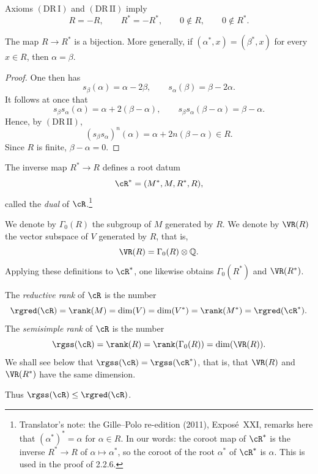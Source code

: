 \begin{remark}\label{sga3:XXI:1.1.3}
Axioms \((\mathrm{DR\,I})\) and \((\mathrm{DR\,II})\) imply
\[
 R=-R,\qquad R^\ast=-R^\ast,\qquad
 0\notin R,\qquad 0\notin R^\ast.
\]
\end{remark}

\begin{lemma}\label{sga3:XXI:1.1.4}
The map \(R\to R^\ast\) is a bijection. More generally, if
\((\alpha^\ast,x)=(\beta^\ast,x)\) for every \(x\in R\), then
\(\alpha=\beta\).
\end{lemma}

\begin{proof}
One then has
\[
 s_\beta(\alpha)=\alpha-2\beta,\qquad
 s_\alpha(\beta)=\beta-2\alpha.
\]
It follows at once that
\[
 s_\beta s_\alpha(\alpha)
   =\alpha+2(\beta-\alpha),\qquad
 s_\beta s_\alpha(\beta-\alpha)
   =\beta-\alpha.
\]
Hence, by \((\mathrm{DR\,II})\),
\[
 (s_\beta s_\alpha)^n(\alpha)
   =\alpha+2n(\beta-\alpha)\in R.
\]
Since \(R\) is finite, \(\beta-\alpha=0\).
\end{proof}

\begin{corollary}\label{sga3:XXI:1.1.5}
The inverse map \(R^\ast\to R\) defines a root datum
\[
 \cR^\ast=(M^\ast,M,R^\ast,R),
\]
called the \emph{dual} of \(\cR\).\footnote{Translator's note: the Gille--Polo re-edition (2011), Exposé~XXI, remarks here that
\((\alpha^\ast)^\ast=\alpha\) for \(\alpha\in R\). In our words: the coroot map of
\(\cR^\ast\) is the inverse \(R^\ast\to R\) of \(\alpha\mapsto\alpha^\ast\), so the
coroot of the root \(\alpha^\ast\) of \(\cR^\ast\) is \(\alpha\). This is used in the
proof of 2.2.6.}
\end{corollary}

\begin{definition}\label{sga3:XXI:1.1.6}
We denote by \(\Gamma_0(R)\) the subgroup of \(M\) generated by \(R\).
We denote by \(\VR(R)\) the vector subspace of \(V\) generated by \(R\),
that is,
\[
 \VR(R)=\Gamma_0(R)\otimes\mathbb Q.
\]
Applying these definitions to \(\cR^\ast\), one likewise obtains
\(\Gamma_0(R^\ast)\) and \(\VR(R^\ast)\).

The \emph{reductive rank} of \(\cR\) is the number
\[
 \rgred(\cR)
 =\rank(M)=\dim(V)=\dim(V^\ast)=\rank(M^\ast)=\rgred(\cR^\ast).
\]
The \emph{semisimple rank} of \(\cR\) is the number
\[
 \rgss(\cR)
 =\rank(R)=\rank(\Gamma_0(R))=\dim(\VR(R)).
\]
We shall see below that
\(\rgss(\cR)=\rgss(\cR^\ast)\), that is, that \(\VR(R)\) and
\(\VR(R^\ast)\) have the same dimension.

Thus \(\rgss(\cR)\leq\rgred(\cR)\).
\end{definition}

